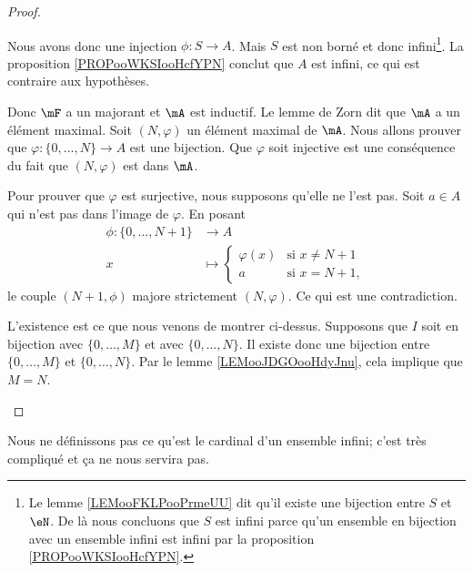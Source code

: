 \begin{proof}
\begin{subproof}
\begin{subproof}
			Nous avons donc une injection \( \phi\colon S\to A\). Mais \( S\) est non borné et donc infini\footnote{Le lemme \ref{LEMooFKLPooPrmeUU} dit qu'il existe une bijection entre \( S\) et \( \eN\). De là nous concluons que \( S\) est infini parce qu'un ensemble en bijection avec un ensemble infini est infini par la proposition \ref{PROPooWKSIooHcfYPN}.}. La proposition \ref{PROPooWKSIooHcfYPN} conclut que \( A\) est infini, ce qui est contraire aux hypothèses.

			Donc \( \mF\) a un majorant et \( \mA\) est inductif.
			Le lemme de Zorn dit que \( \mA\) a un élément maximal.
			\spitem[Conclusion]
			Soit \( (N,\varphi)\) un élément maximal de \( \mA\). Nous allons prouver que \( \varphi\colon \{ 0,\ldots, N \}\to A\) est une bijection. Que \( \varphi\) soit injective est une conséquence du fait que \( (N,\varphi)\) est dans \( \mA\).

			Pour prouver que \( \varphi\) est surjective, nous supposons qu'elle ne l'est pas. Soit \( a\in A\) qui n'est pas dans l'image de \( \varphi\). En posant
			\begin{equation}
				\begin{aligned}
					\phi\colon \{ 0,\ldots, N+1 \} & \to A                                     \\
					x                              & \mapsto \begin{cases}
						                                         \varphi(x) & \text{si } x\neq N+1 \\
						                                         a          & \text{si } x=N+1,
					                                         \end{cases}
				\end{aligned}
			\end{equation}
			le couple \( (N+1,\phi)\) majore strictement \( (N,\varphi)\). Ce qui est une contradiction.
		\end{subproof}
		L'existence est ce que nous venons de montrer ci-dessus.
		Supposons que \( I\) soit en bijection avec \( \{ 0,\ldots, M \}\) et avec \( \{ 0,\ldots,N \}\). Il existe donc une bijection entre \(  \{ 0,\ldots, M \}\) et \( \{ 0,\ldots, N \}\). Par le lemme \ref{LEMooJDGOooHdyJnu}, cela implique que \( M=N\).
	\end{subproof}
\end{proof}
Nous ne définissons pas ce qu'est le cardinal d'un ensemble infini; c'est très compliqué et ça ne nous servira pas.

